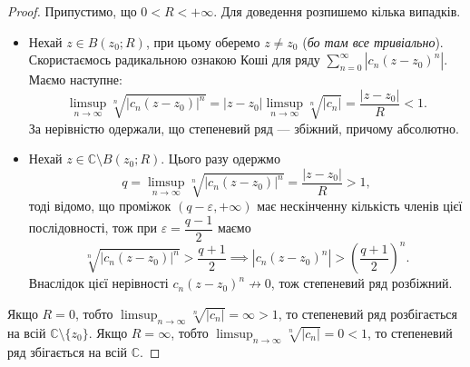 \documentclass{math_library}
\begin{document}
\begin{proof}
Припустимо, що $0 < R < +\infty$. Для доведення розпишемо кілька випадків.
\begin{itemize}[wide=0pt]
\item Нехай $z \in B(z_0;R)$, при цьому оберемо $z \neq z_0$ (\textit{бо там все тривіально}). Скористаємось радикальною ознакою Коші для ряду $\displaystyle\sum_{n=0}^\infty |c_n (z-z_0)^n|$. Маємо наступне:
\[
\limsup_{n \to \infty} \sqrt[n]{|c_n(z-z_0)|^n} = |z-z_0| \limsup_{n \to \infty} \sqrt[n]{|c_n|} = \dfrac{|z-z_0|}{R} < 1.
\]
За нерівністю одержали, що степеневий ряд --- збіжний, причому абсолютно.

\item Нехай $z \in \mathbb{C} \setminus B(z_0;R)$. Цього разу одержмо
\[
q = \limsup_{n \to \infty} \sqrt[n]{|c_n(z-z_0)|^n} = \dfrac{|z-z_0|}{R} > 1,
\]
тоді відомо, що проміжок $(q - \varepsilon, + \infty)$ має нескінченну кількість членів цієї послідовності, тож при $\varepsilon = \dfrac{q-1}{2}$ маємо
\[
\sqrt[n]{|c_n(z-z_0)|^n} > \dfrac{q+1}{2} \implies |c_n(z-z_0)^n| > \left( \dfrac{q+1}{2} \right)^n.
\]
Внаслідок цієї нерівності $c_n(z-z_0)^n \not\to 0$, тож степеневий ряд розбіжний.
\end{itemize}
Якщо $R = 0$, тобто $\limsup_{n \to \infty} \sqrt[n]{|c_n|} = \infty > 1$, то степеневий ряд розбігається на всій $\mathbb{C} \setminus \{z_0\}$. Якщо $R = \infty$, тобто $\limsup_{n \to \infty} \sqrt[n]{|c_n|} = 0 < 1$, то степеневий ряд збігається на всій $\mathbb{C}$.
\end{proof}

\end{document}
